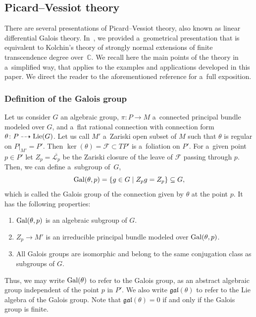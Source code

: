 \documentclass[10pt,a4paper]{amsart}
\numberwithin{equation}{section}
\theoremstyle{definition}
\begin{document}
\subsection{Picard--Vessiot theory}

There are several presentations of Picard--Vessiot theory, also known as linear differential Galois theory. In~\cite[Appendix~A]{bc2017}, we provided a~geometrical presentation that is equivalent to Kolchin's theory of strongly normal extensions of finite transcendence degree over~$\mathbb C$. We recall here the main points of the theory in a~simplified way, that applies to the examples and applications developed in this paper. We direct the reader to the aforementioned reference for a~full exposition.

\subsubsection{Definition of the Galois group}

Let us consider $G$ an algebraic group, $\pi\colon P\to M$ a~connected principal bundle modeled over $G$, and a~flat rational connection with connection form $\theta\colon P \dasharrow {\rm Lie}(G)$.
Let us call $M'$ a~Zariski open subset of $M$ such that $\theta$ is regular on $P|_{M'} = P'$. Then $\ker(\theta) = \mathcal F \subset TP'$ is a~foliation on $P'$. For a~given point $p\in P'$ let $Z_p = \overline{\mathcal L_p}$ be the Zariski closure of the leave of $\mathcal F$ passing through $p$. Then, we can define a~subgroup of~$G$,
\[
{\rm Gal}(\theta, p) = \{g\in G \mid Z_pg = Z_p \} \subseteq G,
\]
which is called the Galois group of the connection given by $\theta$ at the point $p$. It has the following properties:
\begin{enumerate}\itemsep=0pt
\item[(1)] ${\rm Gal}(\theta, p)$ is an algebraic subgroup of $G$.
\item[(2)] $Z_p \to M'$ is an irreducible principal bundle modeled over ${\rm Gal}(\theta, p)$.
\item[(3)] All Galois groups are isomorphic and belong to the same conjugation class as subgroups of $G$.
\end{enumerate}

Thus, we may write ${\rm Gal}(\theta)$ to refer to the Galois group, as an abstract algebraic group independent of the point $p$ in $P'$. We also write $\mathfrak{gal}(\theta)$ to refer to the Lie algebra of the Galois group. Note that $\mathfrak{gal}(\theta) = 0$ if and only if the Galois group is finite.
\end{document}
